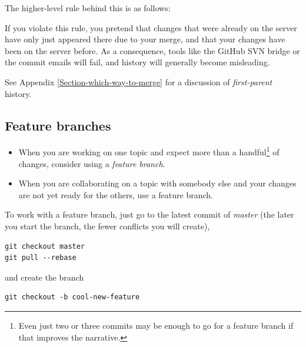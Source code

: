 \documentclass[12pt,pdftex]{article}
\begin{document}
\bigskip

The higher-level rule behind this is as follows:
\begin{quote}
\setlength{\fboxsep}{8pt}
\end{quote}

If you violate this rule, you pretend that changes that were already on
the server have only just appeared there due to your merge, and that
your changes have been on the server before.
As a consequence, tools like the GitHub SVN bridge or the commit emails
will fail, and history will generally become misleading.

See Appendix \ref{Section-which-way-to-merge} for a discussion of
\emph{first-parent} history.


\subsection{Feature branches}
\label{sec-5-2}

\begin{itemize}
\item When you are working on one topic and expect more than a
handful\footnote{Even just two or three commits may be enough to go for a feature
branch if that improves the narrative.} of changes, consider using a \emph{feature branch}.

\item When you are collaborating on a topic with somebody else and your
changes are not yet ready for the others, use a feature branch.
\end{itemize}


To work with a feature branch, just go to the latest commit of \emph{master}
(the later you start the branch, the fewer conflicts you will create),

\lstset{frame=single,basicstyle=\ttfamily\footnotesize,language=sh,label= ,caption= ,captionpos=b,numbers=none}
\begin{lstlisting}
git checkout master
git pull --rebase
\end{lstlisting}
and create the branch
\lstset{frame=single,basicstyle=\ttfamily\footnotesize,language=sh,label= ,caption= ,captionpos=b,numbers=none}
\begin{lstlisting}
git checkout -b cool-new-feature
\end{lstlisting}
\end{document}
